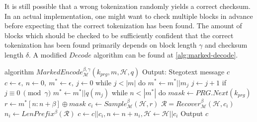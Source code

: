 It is still possible that a wrong tokenization randomly yields a correct checksum.
In an actual implementation, one might want to check multiple blocks in advance before expecting that the correct tokenization has been found.
The amount of blocks which should be checked to be sufficiently confident that the correct tokenization has been found primarily depends on block length $\gamma$ and checksum length $\delta$.
A modified $Decode$ algorithm can be found at \autoref{alg:marked-decode}.

\begin{Pseudocode}[caption={
Marked Encode Algorithm.
The modification this algorithm introduces is that after every $\gamma$ bits a checksum $q(m_i)$ is inserted into the hiddentext.
This allows the recipient to check for decoding errors due to wrong tokenization.
$q$ is a function which generates a checksum of fixed length $\delta$.
}, label={alg:marked-encode}]
algorithm $MarkedEncode_{\mathcal{M}}^{\beta, \gamma}(k_{prg}, m, \mathcal{H}, q)$
	Output: Stegotext message $c$
	$c \leftarrow \epsilon,~ n \leftarrow 0,~ m^* \leftarrow \epsilon,~ j \leftarrow 0$
	while $j < |m|$ do
		$m^* \leftarrow m^* || m_j$
		$j \leftarrow j + 1$
		if $j \equiv 0~ \pmod \gamma$
			$m^* \leftarrow m^* || q(m_j)$
	while $n < |m^*|$ do
		$mask \leftarrow PRG.Next(k_{prg})$
		$r \leftarrow m^*[n:n+\beta] \oplus mask$
		$c_i \leftarrow Sample_{\mathcal{M}}^\beta(\mathcal{H}, r)$
		$\mathcal{R} = Recover_{\mathcal{M}}^\beta(\mathcal{H}, c_i)$
		$n_i \leftarrow LenPrefix^\beta(\mathcal{R})$
		$c \leftarrow c || c_i, n \leftarrow n+n_i, \mathcal{H} \leftarrow \mathcal{H}||c_i$
	Output $c$
\end{Pseudocode}



